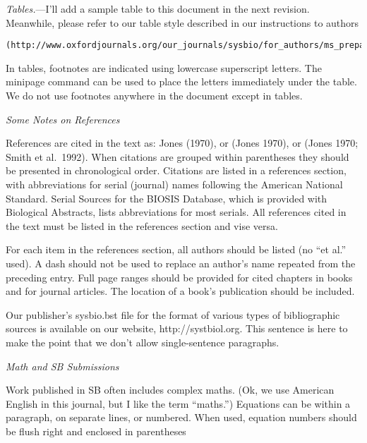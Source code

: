 \documentclass[12pt,letterpaper]{article}
\renewcommand{\subsection}[1]{%
\bigskip
\begin{center}
\begin{large}
\normalfont\itshape #1
\end{large}
\end{center}}
\renewcommand{\subsubsection}[1]{%
\vspace{2ex}
\noindent
\textit{#1.}---}
\begin{document}
\subsubsection{Tables}I'll add a sample table to this document in the
next revision. Meanwhile, please refer to our table style described in
our instructions to authors
\begin{verbatim}(http://www.oxfordjournals.org/our_journals/sysbio/for_authors/ms_preparation.html).\end{verbatim}
In tables, footnotes are indicated using lowercase superscript letters. The
minipage command can be used to place the letters immediately under
the table. We do not use footnotes anywhere in the document except in tables.

\subsection{Some Notes on References}

References are cited in the text as: Jones (1970), or (Jones 1970), or
(Jones 1970; Smith et al.\ 1992). When citations are grouped within
parentheses they should be presented in chronological order. Citations are listed in a references section, with abbreviations for serial
(journal) names following the American National Standard. Serial
Sources for the BIOSIS Database, which is provided with Biological
Abstracts, lists abbreviations for most serials. All references cited
in the text must be listed in the references section and vise versa.

For each item in the references section, all
authors should be listed (no ``et al.'' used). A dash should not be used
to replace an author's name repeated from the preceding entry. Full page
ranges should be provided for cited chapters in books and for journal
articles. The location of a book's publication should be included.

Our publisher's sysbio.bst file for the format of various types of
bibliographic sources is
available on our website, http://systbiol.org. This sentence is here to make the point that we don't allow
single-sentence paragraphs.

\subsection{Math and SB Submissions}

Work published in SB often includes complex maths. (Ok, we use
American English in this journal, but I like the term ``maths.'')
Equations can be within a paragraph, on separate lines, or numbered. When used, equation numbers should be flush right and enclosed in parentheses
\end{document}
